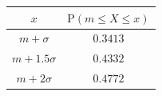 {\setlength{\tabcolsep}{5pt}\renewcommand{\arraystretch}{1.25}%
\begin{tabular}{|c|c|}
\hline
$x$ & $\mathrm{P}(m\le X\le x)$ \\
\hline
$m+\sigma$ & $0.3413$ \\
\hline
$m+1.5\sigma$ & $0.4332$ \\
\hline
$m+2\sigma$ & $0.4772$ \\
\hline
\end{tabular}}
